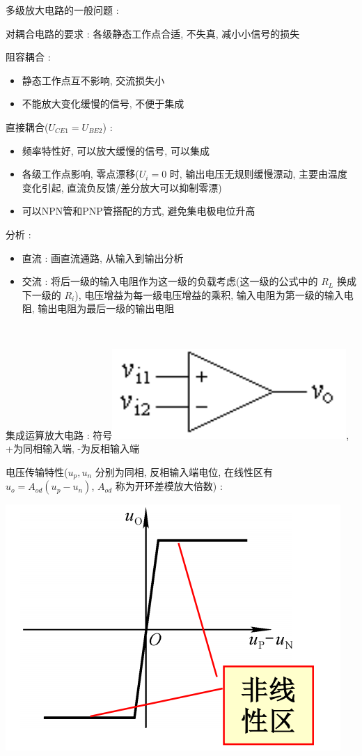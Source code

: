 \documentclass[UTF8, 12pt]{ctexart}
\begin{document}
	\noindent
	多级放大电路的一般问题 :

	对耦合电路的要求 : 各级静态工作点合适, 不失真, 减小小信号的损失

	阻容耦合 :
	\begin{itemize}[leftmargin = 4em]
		\item 静态工作点互不影响, 交流损失小
		\item 不能放大变化缓慢的信号, 不便于集成
	\end{itemize}

	直接耦合($ U_ {CE1} = U_{BE2}$) :
	\begin{itemize}[leftmargin = 4em]
		\item 频率特性好, 可以放大缓慢的信号, 可以集成
		\item 各级工作点影响, 零点漂移($ U_{i} = 0 $ 时, 输出电压无规则缓慢漂动, 主要由温度变化引起, 直流负反馈/差分放大可以抑制零漂)
		\item 可以NPN管和PNP管搭配的方式, 避免集电极电位升高
	\end{itemize}

	分析 :
	\begin{itemize}[leftmargin = 4em]
		\item 直流 : 画直流通路, 从输入到输出分析
		\item 交流 : 将后一级的输入电阻作为这一级的负载考虑(这一级的公式中的 $ R_{L} $ 换成下一级的 $ R_{i} $), 电压增益为每一级电压增益的乘积, 输入电阻为第一级的输入电阻, 输出电阻为最后一级的输出电阻
	\end{itemize}

	~

	\noindent
	集成运算放大电路 : 符号\includegraphics[scale = 0.2]{03/集成运算放大器符号.png}, +为同相输入端, -为反相输入端

	电压传输特性($ u_{p}, u_{n} $ 分别为同相, 反相输入端电位, 在线性区有 $ u_{o} = A_{od}(u_{p}-u_{n}) $, $ A_{od} $ 称为开环差模放大倍数) :

	\includegraphics[scale = 0.4]{03/集成运算放大器电压传输特性.png}
\end{document}
